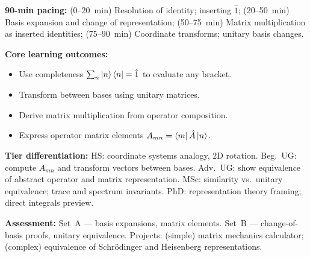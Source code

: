 \documentclass[11pt,a4paper]{article}
\begin{document}
\medskip
\begin{tcolorbox}[modulebox, title={Module~I.2 / L05: Completeness, Change of Basis \& Matrix Mechanics}]
\textbf{90-min pacing:} (0--20~min) Resolution of identity; inserting $\hat{1}$;
(20--50~min) Basis expansion and change of representation;
(50--75~min) Matrix multiplication as inserted identities;
(75--90~min) Coordinate transforms; unitary basis changes.

\medskip\textbf{Core learning outcomes:}
\begin{itemize}[leftmargin=1.4em,topsep=2pt,itemsep=1pt]
  \item Use completeness $\sum_n\ket{n}\bra{n}=\hat{1}$ to evaluate any bracket.
  \item Transform between bases using unitary matrices.
  \item Derive matrix multiplication from operator composition.
  \item Express operator matrix elements $A_{mn}=\bra{m}\hat{A}\ket{n}$.
\end{itemize}

\medskip\textbf{Tier differentiation:}
HS: coordinate systems analogy, $2$D rotation.
Beg.\ UG: compute $A_{mn}$ and transform vectors between bases.
Adv.\ UG: show equivalence of abstract operator and matrix representation.
MSc: similarity vs.\ unitary equivalence; trace and spectrum invariants.
PhD: representation theory framing; direct integrals preview.

\medskip\textbf{Assessment:}
Set~A --- basis expansions, matrix elements.
Set~B --- change-of-basis proofs, unitary equivalence.
Projects: (simple) matrix mechanics calculator; (complex) equivalence of Schr\"odinger and Heisenberg representations.
\end{tcolorbox}
\end{document}
